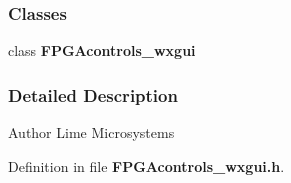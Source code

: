 \subsubsection*{Classes}
\begin{DoxyCompactItemize}
\item 
class {\bf F\+P\+G\+Acontrols\+\_\+wxgui}
\end{DoxyCompactItemize}


\subsubsection{Detailed Description}
\begin{DoxyAuthor}{Author}
Lime Microsystems 
\end{DoxyAuthor}


Definition in file {\bf F\+P\+G\+Acontrols\+\_\+wxgui.\+h}.

